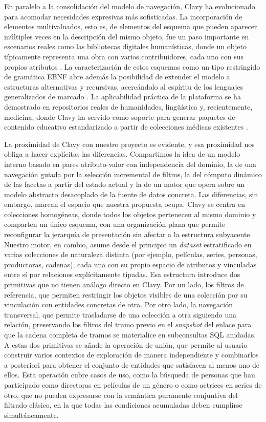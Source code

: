 En paralelo a la consolidación del modelo de navegación, Clavy ha evolucionado para acomodar
necesidades expresivas más sofisticadas. La incorporación de elementos multivaluados, esto es, de
elementos del esquema que pueden aparecer múltiples veces en la descripción del mismo objeto,
fue un paso importante en escenarios reales como las bibliotecas digitales humanísticas, donde un
objeto típicamente representa una obra con varios contribuidores, cada uno con sus propios atributos
\citep{gayoso2023siie}. La caracterización de estos esquemas como un tipo restringido de gramática
EBNF abre además la posibilidad de extender el modelo a estructuras alternativas y recursivas,
acercándolo al espíritu de los lenguajes generalizados de marcado \citep{coombs1987markup}. La aplicabilidad práctica de la
plataforma se ha demostrado en repositorios reales de humanidades, lingüística y, recientemente,
medicina, donde Clavy ha servido como soporte para generar paquetes de contenido educativo
estandarizado a partir de colecciones médicas existentes \citep{buendia2019medsys}.

La proximidad de Clavy con nuestro proyecto es evidente, y esa proximidad nos obliga a hacer explícitas las
diferencias. Compartimos la idea de un modelo interno
basado en pares atributo-valor con independencia del dominio, la de una navegación guiada por la
selección incremental de filtros, la del cómputo dinámico de las facetas a partir del estado actual y la
de un motor que opera sobre un modelo abstracto desacoplado de la fuente de datos concreta. Las
diferencias, sin embargo, marcan el espacio que nuestra propuesta ocupa. Clavy se centra en colecciones
homogéneas, donde todos los objetos pertenecen al mismo dominio y comparten un único esquema,
con una organización plana que permite reconfigurar la jerarquía de presentación sin afectar a la
estructura subyacente. Nuestro motor, en cambio, asume desde el principio un \textit{dataset} estratificado
en varias colecciones de naturaleza distinta (por ejemplo, películas, series, personas, productoras,
cadenas), cada una con su propio espacio de atributos y vinculadas entre sí por relaciones explícitamente
tipadas. Esa estructura introduce dos primitivas que no tienen análogo directo en Clavy. Por un lado, los
filtros de referencia, que permiten restringir los objetos visibles de una colección por su vinculación con
entidades concretas de otra. Por otro lado, la navegación transversal, que permite trasladarse de una
colección a otra siguiendo una relación, preservando los filtros del tramo previo en el \textit{snapshot} del enlace
para que la cadena completa de tramos se materialice en subconsultas SQL anidadas. A estas dos primitivas se añade la
operación de unión, que permite al usuario construir varios contextos de exploración de manera
independiente y combinarlos a posteriori para obtener el conjunto de entidades que satisfacen al menos
uno de ellos. Esta operación cubre casos de uso, como la búsqueda de personas que han participado
como directoras en películas de un género o como actrices en series de otro, que no pueden expresarse
con la semántica puramente conjuntiva del filtrado clásico, en la que todas las condiciones acumuladas
deben cumplirse simultáneamente.

